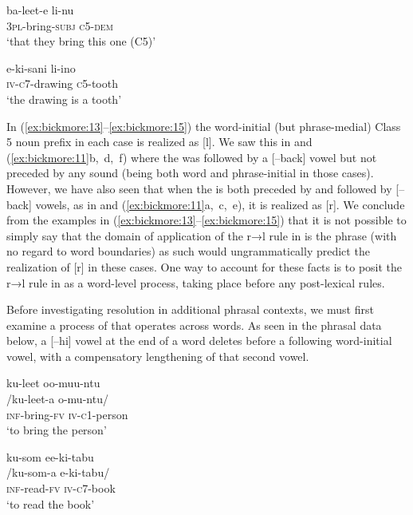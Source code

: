 \documentclass[output=paper,modfonts,nonflat,
colorlinks, citecolor=brown,
draftmode,
]{langsci/langscibook}
\begin{document}
\ea\label{ex:bickmore:14}
\gll  ba-leet-e li-nu  \\
\textsc{3pl-}\textup{bring}\textsc{-subj} \textsc{c5-dem}\\
\glt  ‘that they bring this one (C5)’
\z

\ea\label{ex:bickmore:15}
\gll  e-ki-sani li-ino  \\
\textsc{iv-c7-}\textup{drawing} \textsc{c5-}\textup{tooth}\\
\glt  ‘the drawing is a tooth’    
\z

In (\ref{ex:bickmore:13}--\ref{ex:bickmore:15}) the word-initial (but phrase-medial) Class 5 noun prefix in each case is realized as [l]. We saw this in  and (\ref{ex:bickmore:11}b,~d,~f) where the  was followed by a [--back] vowel but not preceded by any sound (being both word and phrase-initial in those cases). However, we have also seen that when the  is both preceded by and followed by [--back] vowels, as in  and (\ref{ex:bickmore:11}a,~c,~e), it is realized as [r]. We conclude from the examples in (\ref{ex:bickmore:13}--\ref{ex:bickmore:15}) that it is not possible to simply say that the domain of application of the r→l rule in  is the phrase (with no regard to word boundaries) as such would ungrammatically predict the realization of [r] in these cases. One way to account for these facts is to posit the r→l rule in  as a word-level process, taking place before any post-lexical rules. 

Before investigating  resolution in additional phrasal contexts, we must first examine a process of  that operates across words. As seen in the phrasal data below, a [--hi] vowel at the end of a word deletes before a following word-initial vowel, with a compensatory lengthening of that second vowel.


\ea\label{ex:bickmore:16}
\ea\label{ex:bickmore:16a}
\glll ku-leet oo-muu-ntu  \\
      /ku-leet-a o-mu-ntu/\\
  \textsc{inf-}\textup{bring}\textsc{-fv} \textsc{iv-c1-}\textup{person}\\
\glt      ‘to bring the person’

\ex\label{ex:bickmore:16b}
\glll ku-som ee-ki-tabu\\        
/ku-som-a e-ki-tabu/\\
\textsc{inf-}\textup{read}\textsc{-fv} \textsc{iv-c7-}\textup{book}\\
\glt      ‘to read the book’
\end{document}
